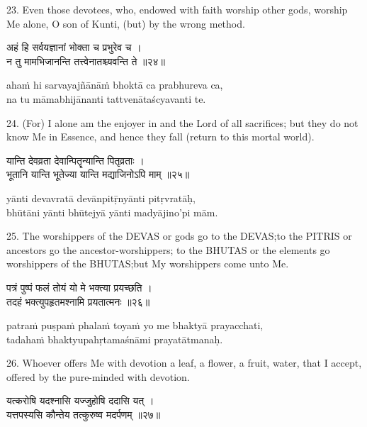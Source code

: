23. Even those devotees, who, endowed with faith worship other gods, worship Me
alone, O son of Kunti, (but) by the wrong method.

\begin{gitaverse}
अहं हि सर्वयज्ञानां भोक्ता च प्रभुरेव च । \\
न तु मामभिजानन्ति तत्त्वेनातश्च्यवन्ति ते ॥२४॥
\end{gitaverse}

\begin{transliteration}
ahaṁ hi sarvayajñānāṁ bhoktā ca prabhureva ca, \\
na tu māmabhijānanti tattvenātaścyavanti te.
\end{transliteration}

24. (For) I alone am the enjoyer in and the Lord of all sacrifices; but they do
not know Me in Essence, and hence they fall (return to this mortal world).

\begin{gitaverse}
यान्ति देवव्रता देवान्पितॄन्यान्ति पितृव्रताः । \\
भूतानि यान्ति भूतेज्या यान्ति मद्याजिनोऽपि माम् ॥२५॥
\end{gitaverse}

\begin{transliteration}
yānti devavratā devānpitṝnyānti pitṛvratāḥ, \\
bhūtāni yānti bhūtejyā yānti madyājino'pi mām.
\end{transliteration}

25. The worshippers of the DEVAS or gods go to the DEVAS;\@ to the PITRIS or
ancestors go the ancestor-worshippers; to the BHUTAS or the elements go
worshippers of the BHUTAS;\@ but My worshippers come unto Me.

\begin{gitaverse}
पत्रं पुष्पं फलं तोयं यो मे भक्त्या प्रयच्छति । \\
तदहं भक्त्युपहृतमश्नामि प्रयतात्मनः ॥२६॥
\end{gitaverse}

\begin{transliteration}
patraṁ puṣpaṁ phalaṁ toyaṁ yo me bhaktyā prayacchati, \\
tadahaṁ bhaktyupahṛtamaśnāmi prayatātmanaḥ.
\end{transliteration}

26. Whoever offers Me with devotion a leaf, a flower, a fruit, water, that I
accept, offered by the pure-minded with devotion.

\begin{gitaverse}
यत्करोषि यदश्नासि यज्जुहोषि ददासि यत् । \\
यत्तपस्यसि कौन्तेय तत्कुरुष्व मदर्पणम् ॥२७॥
\end{gitaverse}

